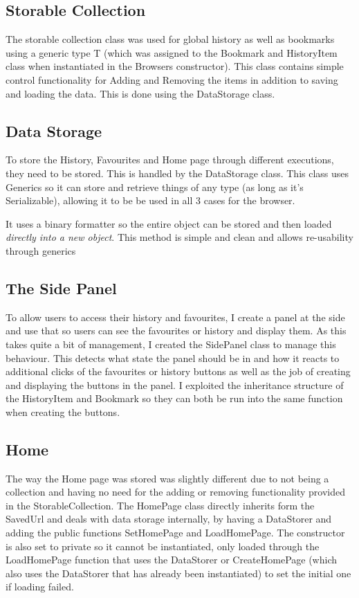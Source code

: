 \documentclass[11pt]{report}
\begin{document}
\subsection{Storable Collection}
The storable collection class was used for global history as well as bookmarks using a generic type T (which was assigned to the Bookmark and HistoryItem class when instantiated in the Browsers constructor).  This class contains simple control functionality for Adding and Removing the items in addition to saving and loading the data.  This is done using the DataStorage class.

\subsection{Data Storage}

To store the History, Favourites and Home page through different executions, they need to be stored.  This is handled by the DataStorage class.  This class uses Generics so it can store and retrieve things of any type (as long as it's Serializable), allowing it to be be used in all 3 cases for the browser.

It uses a binary formatter so the entire object can be stored and then loaded \textit{directly into a new object}.  This method is simple and clean and allows re-usability through generics

\subsection{The Side Panel}

To allow users to access their history and favourites, I create a panel at the side and use that so users can see the favourites or history and display them.  As this takes quite a bit of management, I created the SidePanel class to manage this behaviour.  This detects what state the panel should be in and how it reacts to additional clicks of the favourites or history buttons as well as the job of creating and displaying the buttons in the panel.  I exploited the inheritance structure of the HistoryItem and Bookmark so they can both be run into the same function when creating the buttons.

\subsection{Home}

The way the Home page was stored was slightly different due to not being a collection and having no need for the adding or removing functionality provided in the StorableCollection.  The HomePage class directly inherits form the SavedUrl and deals with data storage internally, by having a DataStorer and adding the public functions SetHomePage and LoadHomePage.  The constructor is also set to private so it cannot be instantiated, only loaded through the LoadHomePage function that uses the DataStorer or CreateHomePage (which also uses the DataStorer that has already been instantiated) to set the initial one if loading failed.
\end{document}
